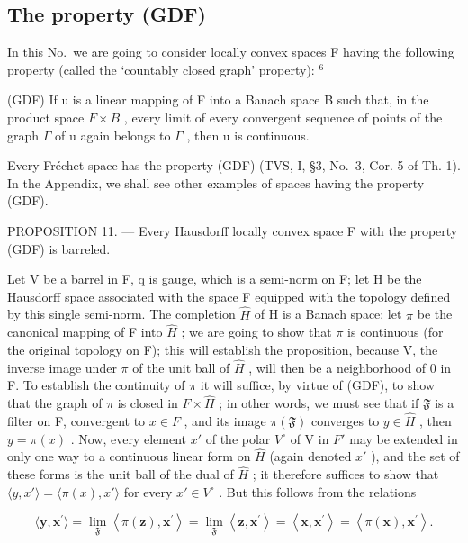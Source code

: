 \subsection{The property (GDF)}

In this No.~we are going to consider locally convex spaces F having the following property (called the `countably closed graph' property): \(^{6}\)

(GDF) If u is a linear mapping of F into a Banach space B such that, in the product space \(F \times B\) , every limit of every convergent sequence of points of the graph \(\Gamma\) of u again belongs to \(\Gamma\) , then u is continuous.

Every Fréchet space has the property (GDF) (TVS, I, §3, No.~3, Cor. 5 of Th. 1). In the Appendix, we shall see other examples of spaces having the property (GDF).

PROPOSITION 11. --- Every Hausdorff locally convex space F with the property (GDF) is barreled.

Let V be a barrel in F, q is gauge, which is a semi-norm on F; let H be the Hausdorff space associated with the space F equipped with the topology defined by this single semi-norm. The completion \(\hat{H}\) of H is a Banach space; let \(\pi\) be the canonical mapping of F into \(\hat{H}\) ; we are going to show that \(\pi\) is continuous (for the original topology on F); this will establish the proposition, because V, the inverse image under \(\pi\) of the unit ball of \(\hat{H}\) , will then be a neighborhood of 0 in F. To establish the continuity of \(\pi\) it will suffice, by virtue of (GDF), to show that the graph of \(\pi\) is closed in \(F \times \hat{H}\) ; in other words, we must see that if \(\mathfrak{F}\) is a filter on F, convergent to \(x \in F\) , and its image \(\pi(\mathfrak{F})\) converges to \(y \in \hat{H}\) , then \(y = \pi(x)\) . Now, every element \(x'\) of the polar \(V^{\circ}\) of V in \(F'\) may be extended in only one way to a continuous linear form on \(\hat{H}\) (again denoted \(x'\) ), and the set of these forms is the unit ball of the dual of \(\hat{H}\) ; it therefore suffices to show that \(\langle y, x' \rangle = \langle \pi(x), x' \rangle\) for every \(x' \in V^{\circ}\) . But this follows from the relations

\[
\langle \mathbf {y}, \mathbf {x} ^ {\prime} \rangle = \lim _ {\mathfrak {F}} \left\langle \pi (\mathbf {z}), \mathbf {x} ^ {\prime} \right\rangle = \lim _ {\mathfrak {F}} \left\langle \mathbf {z}, \mathbf {x} ^ {\prime} \right\rangle = \left\langle \mathbf {x}, \mathbf {x} ^ {\prime} \right\rangle = \left\langle \pi (\mathbf {x}), \mathbf {x} ^ {\prime} \right\rangle .
\]

